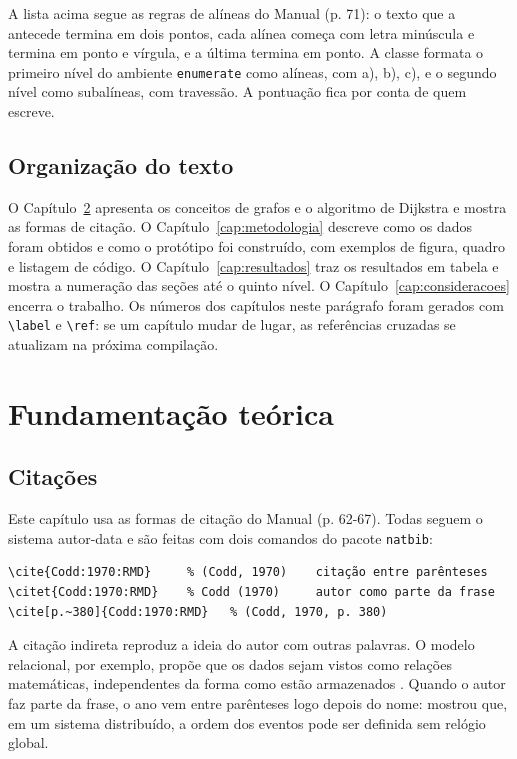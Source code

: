 \documentclass[diss,capa]{texufpel}
\begin{document}
A lista acima segue as regras de alíneas do Manual (p. 71): o texto que a
antecede termina em dois pontos, cada alínea começa com letra minúscula e
termina em ponto e vírgula, e a última termina em ponto. A classe formata o
primeiro nível do ambiente \texttt{enumerate} como alíneas, com a), b), c), e o
segundo nível como subalíneas, com travessão. A pontuação fica por conta de
quem escreve.

\section{Organização do texto}

O Capítulo~\ref{cap:fundamentacao} apresenta os conceitos de grafos e o
algoritmo de Dijkstra e mostra as formas de citação. O
Capítulo~\ref{cap:metodologia} descreve como os dados foram obtidos e como o
protótipo foi construído, com exemplos de figura, quadro e listagem de código.
O Capítulo~\ref{cap:resultados} traz os resultados em tabela e mostra a
numeração das seções até o quinto nível. O Capítulo~\ref{cap:consideracoes}
encerra o trabalho. Os números dos capítulos neste parágrafo foram gerados com
\verb|\label| e \verb|\ref|: se um capítulo mudar de lugar, as referências
cruzadas se atualizam na próxima compilação.

\chapter{Fundamentação teórica}
\label{cap:fundamentacao}

\section{Citações}
\label{sec:citacoes}

Este capítulo usa as formas de citação do Manual (p. 62-67). Todas seguem o
sistema autor-data e são feitas com dois comandos do pacote \texttt{natbib}:

\begin{lstlisting}[language={[LaTeX]TeX}, numbers=none]
\cite{Codd:1970:RMD}     % (Codd, 1970)    citação entre parênteses
\citet{Codd:1970:RMD}    % Codd (1970)     autor como parte da frase
\cite[p.~380]{Codd:1970:RMD}   % (Codd, 1970, p. 380)
\end{lstlisting}

A citação indireta reproduz a ideia do autor com outras palavras. O modelo
relacional, por exemplo, propõe que os dados sejam vistos como relações
matemáticas, independentes da forma como estão armazenados
\citep{Codd:1970:RMD}. Quando o autor faz parte da frase, o ano vem entre
parênteses logo depois do nome: \citet{Lamport:1978:TCO} mostrou que, em um
sistema distribuído, a ordem dos eventos pode ser definida sem relógio
global.
\end{document}
